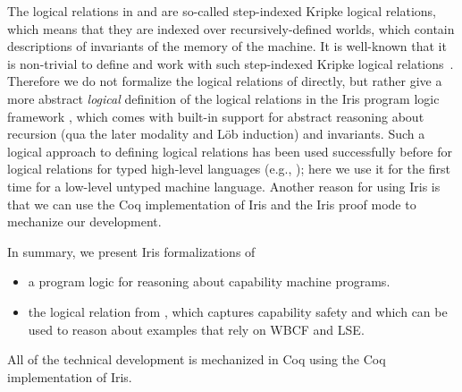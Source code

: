 \documentclass[sigplan,review]{acmart}\settopmatter{printfolios=true,printccs=false,printacmref=false}
\begin{document}
The logical relations in \cite{skorstengaardESOP18} and \cite{SkorstengaardPOPL19} are so-called step-indexed Kripke logical relations, which means that they are indexed over recursively-defined worlds, which contain descriptions of invariants of the memory of the machine.
It is well-known that it is non-trivial to define and work with such step-indexed Kripke logical relations~\cite{ahmed-2002, birkedal2011step}.
Therefore we do not formalize the logical relations of \citeauthor{skorstengaardESOP18} 
directly, but rather give a more abstract \emph{logical} definition of the logical relations in the Iris program logic framework \cite{iris,iris2,iris3, iris-jfp}, which comes with built-in support for abstract reasoning about recursion (qua the later modality and L{\"o}b induction) and invariants.
Such a logical approach to defining logical relations has been used successfully before for logical relations for typed high-level languages (e.g., \cite{lslr-journal,iris:type-effect,rustbelt,runst-popl18}); here we use it for the first time for a low-level untyped machine language.
Another reason for using Iris is that we can use the Coq implementation of Iris and
the Iris proof mode \cite{Krebbers:2017} to mechanize our development. 

In summary, we present Iris formalizations of 
\begin{itemize}
  \item a program logic for reasoning about capability machine programs.
  \item the logical relation from \cite{skorstengaardESOP18}, 
    which captures capability safety and which can be used to reason about examples
    that rely on WBCF and LSE.
\end{itemize}
All of the technical development is mechanized in Coq using the Coq implementation of Iris.


\end{document}
